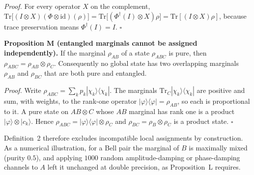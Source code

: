 \documentclass[final,3p,times]{elsarticle}
\begin{document}
\noindent\textit{Proof.} For every operator $X$ on the complement, $\mathrm{Tr}\big[(I\otimes X)(\Phi\otimes\mathrm{id})(\rho)\big]=\mathrm{Tr}\big[(\Phi^\dagger(I)\otimes X)\rho\big]=\mathrm{Tr}[(I\otimes X)\rho]$, because trace preservation means $\Phi^\dagger(I)=I$. $\square$

\noindent\textbf{Proposition M (entangled marginals cannot be assigned independently).} If the marginal $\rho_{AB}$ of a state $\rho_{ABC}$ is pure, then $\rho_{ABC}=\rho_{AB}\otimes\rho_C$. Consequently no global state has two overlapping marginals $\rho_{AB}$ and $\rho_{BC}$ that are both pure and entangled.

\noindent\textit{Proof.} Write $\rho_{ABC}=\sum_kp_k|\chi_k\rangle\langle\chi_k|$. The marginals $\mathrm{Tr}_C|\chi_k\rangle\langle\chi_k|$ are positive and sum, with weights, to the rank-one operator $|\varphi\rangle\langle\varphi|=\rho_{AB}$, so each is proportional to it. A pure state on $AB\otimes C$ whose $AB$ marginal has rank one is a product $|\varphi\rangle\otimes|c_k\rangle$. Hence $\rho_{ABC}=|\varphi\rangle\langle\varphi|\otimes\rho_C$ and $\rho_{BC}=\rho_B\otimes\rho_C$ is a product state. $\square$

Definition~2 therefore excludes incompatible local assignments by construction. As a numerical illustration, for a Bell pair the marginal of $B$ is maximally mixed (purity $0.5$), and applying $1000$ random amplitude-damping or phase-damping channels to $A$ left it unchanged at double precision, as Proposition~L requires.
\end{document}
